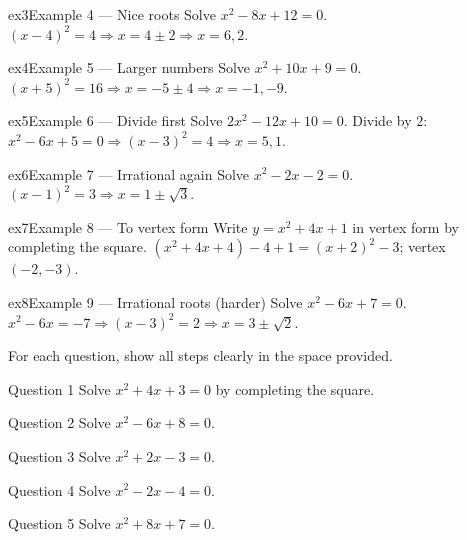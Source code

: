 \documentclass[11pt]{article}
\begin{document}
\begin{example}{ex3}{Example 4 --- Nice roots}
Solve $x^2-8x+12=0$.
\soln $(x-4)^2=4\Rightarrow x=4\pm2\Rightarrow x=6,2.$
\end{example}

\begin{example}{ex4}{Example 5 --- Larger numbers}
Solve $x^2+10x+9=0$.
\soln $(x+5)^2=16\Rightarrow x=-5\pm4\Rightarrow x=-1,-9.$
\end{example}

\begin{example}{ex5}{Example 6 --- Divide first}
Solve $2x^2-12x+10=0$.
\soln Divide by $2$: $x^2-6x+5=0\Rightarrow (x-3)^2=4\Rightarrow x=5,1.$
\end{example}

\begin{example}{ex6}{Example 7 --- Irrational again}
Solve $x^2-2x-2=0$.
\soln $(x-1)^2=3\Rightarrow x=1\pm\sqrt3.$
\end{example}

\begin{example}{ex7}{Example 8 --- To vertex form}
Write $y=x^2+4x+1$ in vertex form by completing the square.
\soln $(x^2+4x+4)-4+1=(x+2)^2-3$; vertex $(-2,-3)$.
\end{example}

\begin{example}{ex8}{Example 9 --- Irrational roots (harder)}
Solve $x^2-6x+7=0$.
\soln $x^2-6x=-7\Rightarrow (x-3)^2=2\Rightarrow x=3\pm\sqrt2.$
\end{example}

\clearpage
{}
For each question, show all steps clearly in the space provided.

\begin{qbox}{Question 1}
Solve $x^2+4x+3=0$ by completing the square.\workspace{2.4cm}
\end{qbox}

\begin{qbox}{Question 2}
Solve $x^2-6x+8=0$.\workspace{2.4cm}
\end{qbox}

\begin{qbox}{Question 3}
Solve $x^2+2x-3=0$.\workspace{2.4cm}
\end{qbox}

\begin{qbox}{Question 4}
Solve $x^2-2x-4=0$.\workspace{2.4cm}
\end{qbox}

\begin{qbox}{Question 5}
Solve $x^2+8x+7=0$.\workspace{2.4cm}
\end{qbox}
\end{document}
